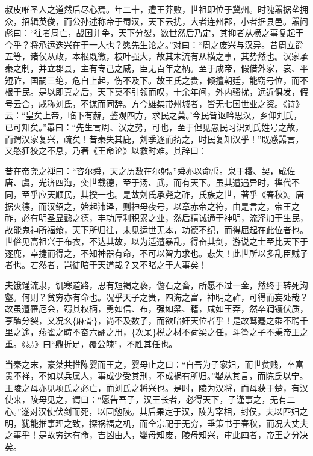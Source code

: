 \documentclass[]{article}
\begin{document}
叔皮唯圣人之道然后尽心焉。年二十，遭王莽败，世祖即位于冀州。时隗嚣据垄拥众，招辑英俊，而公孙述称帝于蜀汉，天下云扰，大者连州郡，小者据县邑。嚣问彪曰：``往者周亡，战国并争，天下分裂，数世然后乃定，其抑者从横之事复起于今乎？将承运迭兴在于一人也？愿先生论之。''对曰：``周之废兴与汉异。昔周立爵五等，诸侯从政，本根既微，枝叶强大，故其末流有从横之事，其势然也。汉家承秦之制，并立郡县，主有专己之威，臣无百年之柄。至于成帝，假借外家，哀、平短祚，国嗣三绝，危自上起，伤不及下。故王氏之贵，倾擅朝廷，能窃号位，而不根于民。是以即真之后，天下莫不引领而叹，十余年间，外内骚扰，远近俱发，假号云合，咸称刘氏，不谋而同辞。方今雄桀带州城者，皆无七国世业之资。《诗》云：``皇矣上帝，临下有赫，鉴观四方，求民之莫。'今民皆讴吟思汉，乡仰刘氏，已可知矣。''嚣曰：``先生言周、汉之势，可也，至于但见愚民习识刘氏姓号之故，而谓汉家复兴，疏矣！昔秦失其鹿，刘季逐而掎之，时民复知汉乎！''既感嚣言，又愍狂狡之不息，乃著《王命论》以救时难。其辞曰：

昔在帝尧之禅曰：``咨尔舜，天之历数在尔躬。''舜亦以命禹。泉于稷、契，咸佐唐、虞，光济四海，奕世载德，至于汤、武，而有天下。虽其遭遇异时，禅代不同，至乎应天顺民，其揆一也。是故刘氏承尧之祚，氏族之世，著乎《春秋》。唐据火德，而汉绍之，始起沛泽，则神母夜号，以章赤帝之符，由是言之，帝王之祚，必有明圣显懿之德，丰功厚利积累之业，然后精诚通于神明，流泽加于生民，故能鬼神所福飨，天下所归往，未见运世无本，功德不纪，而得屈起在此位者也。世俗见高祖兴于布衣，不达其故，以为适遭暴乱，得奋其剑，游说之士至比天下于逐鹿，幸捷而得之，不知神器有命，不可以智力求也。悲失！此世所以多乱臣贼子者也。若然者，岂徒暗于天道哉？又不睹之于人事矣！

夫饿馑流隶，饥寒道路，思有短褐之亵，儋石之畜，所愿不过一金，然终于转死沟壑。何则？贫穷亦有命也。况乎天子之贵，四海之富，神明之祚，可得而妄处哉？故虽遭罹厄会，窃其权柄，勇如信、布，强如梁、籍，咸如王莽，然卒润镬伏质，亨醢分裂，又况幺\{麻骨\}，尚不及数子，而欲暗奸天位者乎！是故驽蹇之乘不聘千里之途，燕雀之畴不奋六翮之用，\{次呆\}棁之材不荷梁之任，斗筲之子不秉帝王之重。《易》曰``鼎折足，覆公餗''，不胜其任也。

当秦之末，豪桀共推陈婴而王之，婴母止之曰：``自吾为子家妇，而世贫贱，卒富贵不祥，不如以兵属人，事成少受其刑，不成祸有所归。''婴从其言，而陈氏以宁。王陵之母亦见项氏之必亡，而刘氏之将兴也。是时，陵为汉将，而母获于楚，有汉使来，陵母见之，谓曰：``愿告吾子，汉王长者，必得天下，子谨事之，无有二心。''遂对汉使伏剑而死，以固勉陵。其后果定于汉，陵为宰相，封侯。夫以匹妇之明，犹能推事理之致，探祸福之机，而全宗祀于无穷，垂策书于春秋，而况大丈夫之事乎！是故穷达有命，吉凶由人，婴母知废，陵母知兴，审此四者，帝王之分决矣。
\end{document}
